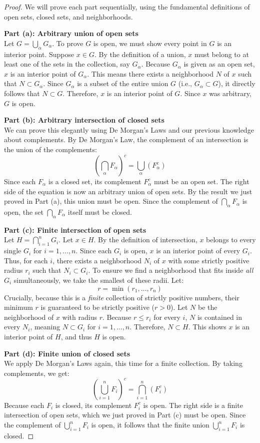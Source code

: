 \documentclass{article}
\theoremstyle{mythm}
\begin{document}
\begin{proof}
We will prove each part sequentially, using the fundamental definitions of open sets, closed sets, and neighborhoods.

\textbf{Part (a): Arbitrary union of open sets} \\
Let $G = \bigcup_\alpha G_\alpha$. To prove $G$ is open, we must show every point in $G$ is an interior point. 
Suppose $x \in G$. By the definition of a union, $x$ must belong to at least one of the sets in the collection, say $G_\alpha$. Because $G_\alpha$ is given as an open set, $x$ is an interior point of $G_\alpha$. This means there exists a neighborhood $N$ of $x$ such that $N \subset G_\alpha$. 
Since $G_\alpha$ is a subset of the entire union $G$ (i.e., $G_\alpha \subset G$), it directly follows that $N \subset G$. Therefore, $x$ is an interior point of $G$. Since $x$ was arbitrary, $G$ is open.

\textbf{Part (b): Arbitrary intersection of closed sets} \\
We can prove this elegantly using De Morgan's Laws and our previous knowledge about complements. By De Morgan's Law, the complement of an intersection is the union of the complements:
\[ \left(\bigcap_\alpha F_\alpha\right)^c = \bigcup_\alpha (F_\alpha^c) \]
Since each $F_\alpha$ is a closed set, its complement $F_\alpha^c$ must be an open set. The right side of the equation is now an arbitrary union of open sets. By the result we just proved in Part (a), this union must be open. 
Since the complement of $\bigcap_\alpha F_\alpha$ is open, the set $\bigcap_\alpha F_\alpha$ itself must be closed.

\textbf{Part (c): Finite intersection of open sets} \\
Let $H = \bigcap_{i=1}^n G_i$. Let $x \in H$. By the definition of intersection, $x$ belongs to every single $G_i$ for $i = 1, \dots, n$. 
Since each $G_i$ is open, $x$ is an interior point of every $G_i$. Thus, for each $i$, there exists a neighborhood $N_i$ of $x$ with some strictly positive radius $r_i$ such that $N_i \subset G_i$. 
To ensure we find a neighborhood that fits inside \textit{all} $G_i$ simultaneously, we take the smallest of these radii. Let:
\[ r = \min(r_1, \dots, r_n) \]
Crucially, because this is a \textit{finite} collection of strictly positive numbers, their minimum $r$ is guaranteed to be strictly positive ($r > 0$). Let $N$ be the neighborhood of $x$ with radius $r$. Because $r \le r_i$ for every $i$, $N$ is contained in every $N_i$, meaning $N \subset G_i$ for $i = 1, \dots, n$. 
Therefore, $N \subset H$. This shows $x$ is an interior point of $H$, and thus $H$ is open.

\textbf{Part (d): Finite union of closed sets} \\
We apply De Morgan's Laws again, this time for a finite collection. By taking complements, we get:
\[ \left(\bigcup_{i=1}^n F_i\right)^c = \bigcap_{i=1}^n (F_i^c) \]
Because each $F_i$ is closed, its complement $F_i^c$ is open. The right side is a finite intersection of open sets, which we just proved in Part (c) must be open. 
Since the complement of $\bigcup_{i=1}^n F_i$ is open, it follows that the finite union $\bigcup_{i=1}^n F_i$ is closed.
\end{proof}
\end{document}
